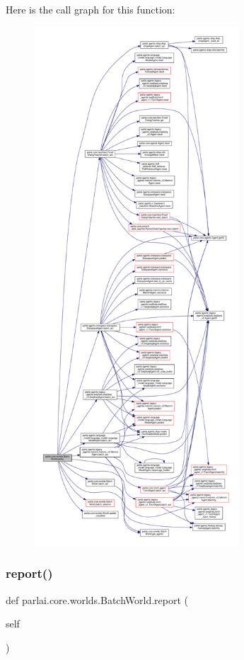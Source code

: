 Here is the call graph for this function\+:
\nopagebreak
\begin{figure}[H]
\begin{center}
\leavevmode
\includegraphics[height=550pt]{classparlai_1_1core_1_1worlds_1_1BatchWorld_a297ab42faba47581774cd9333c874905_cgraph}
\end{center}
\end{figure}
\mbox{\label{classparlai_1_1core_1_1worlds_1_1BatchWorld_af6ca90db5542bf4a74a122ea04ba8bef}} 
\subsubsection{\texorpdfstring{report()}{report()}}
{\footnotesize\ttfamily def parlai.\+core.\+worlds.\+Batch\+World.\+report (\begin{DoxyParamCaption}\item[{}]{self }\end{DoxyParamCaption})}

